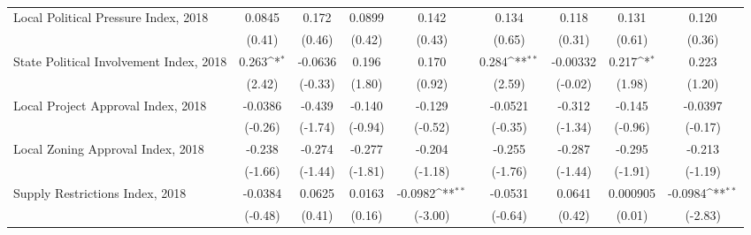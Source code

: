 \begin{table}[htbp]\centering
\def\sym#1{\ifmmode^{#1}\else\(^{#1}\)\fi}
\caption{ \label{tab1}}
\begin{tabular}{l*{8}{c}}
\toprule
\midrule
Local Political Pressure Index, 2018&      0.0845         &       0.172         &      0.0899         &       0.142         &       0.134         &       0.118         &       0.131         &       0.120         \\
                    &      (0.41)         &      (0.46)         &      (0.42)         &      (0.43)         &      (0.65)         &      (0.31)         &      (0.61)         &      (0.36)         \\
\addlinespace
State Political Involvement Index, 2018&       0.263\sym{*}  &     -0.0636         &       0.196         &       0.170         &       0.284\sym{**} &    -0.00332         &       0.217\sym{*}  &       0.223         \\
                    &      (2.42)         &     (-0.33)         &      (1.80)         &      (0.92)         &      (2.59)         &     (-0.02)         &      (1.98)         &      (1.20)         \\
\addlinespace
Local Project Approval Index, 2018&     -0.0386         &      -0.439         &      -0.140         &      -0.129         &     -0.0521         &      -0.312         &      -0.145         &     -0.0397         \\
                    &     (-0.26)         &     (-1.74)         &     (-0.94)         &     (-0.52)         &     (-0.35)         &     (-1.34)         &     (-0.96)         &     (-0.17)         \\
\addlinespace
Local Zoning Approval Index, 2018&      -0.238         &      -0.274         &      -0.277         &      -0.204         &      -0.255         &      -0.287         &      -0.295         &      -0.213         \\
                    &     (-1.66)         &     (-1.44)         &     (-1.81)         &     (-1.18)         &     (-1.76)         &     (-1.44)         &     (-1.91)         &     (-1.19)         \\
\addlinespace
Supply Restrictions Index, 2018&     -0.0384         &      0.0625         &      0.0163         &     -0.0982\sym{**} &     -0.0531         &      0.0641         &    0.000905         &     -0.0984\sym{**} \\
                    &     (-0.48)         &      (0.41)         &      (0.16)         &     (-3.00)         &     (-0.64)         &      (0.42)         &      (0.01)         &     (-2.83)         \\

\end{tabular}
\end{table}
